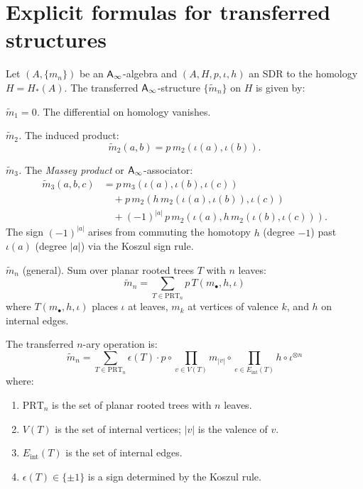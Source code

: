 \section{Explicit formulas for transferred structures}
\label{sec:transfer-formulas}

\begin{construction}
\label{constr:transfer-ainf}
Let $(A, \{m_n\})$ be an $\mathsf{A}_{\infty}$-algebra and $(A, H, p, \iota, h)$ an SDR to 
the homology $H = H_*(A)$. The transferred $\mathsf{A}_{\infty}$-structure $\{\tilde{m}_n\}$ 
on $H$ is given by:

\emph{$\tilde{m}_1 = 0$.} The differential on homology vanishes.

\emph{$\tilde{m}_2$.} The induced product:
\[
\tilde{m}_2(a, b) = p \, m_2(\iota(a), \iota(b)).
\]

\emph{$\tilde{m}_3$.} The \emph{Massey product} or $\mathsf{A}_{\infty}$-associator:
\begin{align*}
\tilde{m}_3(a, b, c) &= p \, m_3(\iota(a), \iota(b), \iota(c)) \\
&\quad + p \, m_2(h \, m_2(\iota(a), \iota(b)), \iota(c)) \\
&\quad + (-1)^{|a|}\, p \, m_2(\iota(a), h \, m_2(\iota(b), \iota(c))).
\end{align*}
The sign $(-1)^{|a|}$ arises from commuting the homotopy $h$ (degree $-1$) past $\iota(a)$ (degree $|a|$) via the Koszul sign rule.

\emph{$\tilde{m}_n$} (general). Sum over planar rooted trees $T$ with $n$ 
leaves:
\[
\tilde{m}_n = \sum_{T \in \mathrm{PRT}_n} p \, T(m_\bullet, h, \iota)
\]
where $T(m_\bullet, h, \iota)$ places $\iota$ at leaves, $m_k$ at vertices of 
valence $k$, and $h$ on internal edges.
\end{construction}

\begin{theorem}
\label{thm:tree-formula}
The transferred $n$-ary operation is:
\[
\tilde{m}_n = \sum_{T \in \mathrm{PRT}_n} \epsilon(T) \cdot p \circ \prod_{v \in V(T)} 
m_{|v|} \circ \prod_{e \in E_{\mathrm{int}}(T)} h \circ \iota^{\otimes n}
\]
where:
\begin{enumerate}[label=(\roman*)]
\item $\mathrm{PRT}_n$ is the set of planar rooted trees with $n$ leaves.
\item $V(T)$ is the set of internal vertices; $|v|$ is the valence of $v$.
\item $E_{\mathrm{int}}(T)$ is the set of internal edges.
\item $\epsilon(T) \in \{\pm 1\}$ is a sign determined by the Koszul rule.
\end{enumerate}
\end{theorem}

